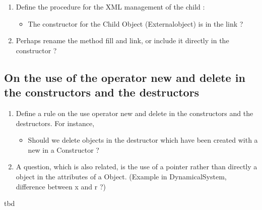 



 \begin{ndr}
   \begin{enumerate}
   \item Define the procedure for the XML management of the child :
     \begin{itemize}
     \item The constructor for the Child Object (Externalobject) is in the link ?
     \end{itemize}
   \item Perhaps rename the method fill and link, or include it directly in the constructor ?
   \end{enumerate}
 \end{ndr}

\clearpage

%





\subsection{On the use of the operator new and delete in the constructors and the destructors}


\begin{ndr}
  \begin{enumerate}
  \item Define a rule on the use  operator new and delete in the constructors and the destructors. For instance, 
    \begin{itemize}
    \item Should we delete objects in the destructor which have been created with a new in a Constructor ?
    \end{itemize}
  \item A question, which is also related, is  the use of a pointer rather than directly a object in the attributes of a Object. (Example in DynamicalSystem, difference between x and r ?)
  \end{enumerate}
\end{ndr}
\ac{tbd}
\clearpage


